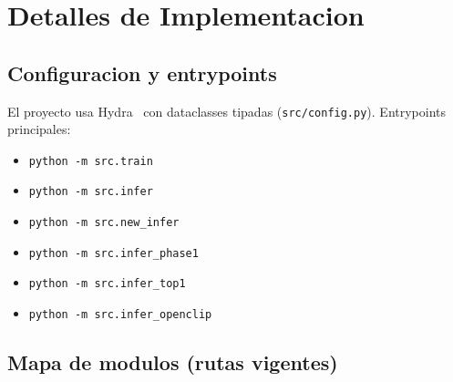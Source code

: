 \section{Detalles de Implementacion}

\subsection{Configuracion y entrypoints}

El proyecto usa Hydra~\cite{yadan2019hydra} con dataclasses tipadas (\texttt{src/config.py}). Entrypoints principales:
\begin{itemize}
  \item \texttt{python -m src.train}
  \item \texttt{python -m src.infer}
  \item \texttt{python -m src.new\_infer}
  \item \texttt{python -m src.infer\_phase1}
  \item \texttt{python -m src.infer\_top1}
  \item \texttt{python -m src.infer\_openclip}
\end{itemize}

\subsection{Mapa de modulos (rutas vigentes)}

